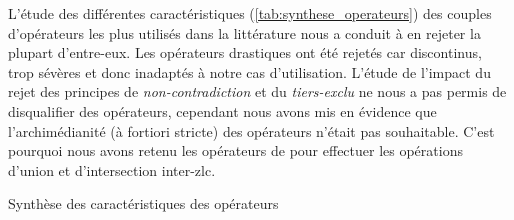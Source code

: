 L'étude des différentes caractéristiques
(\autoref{tab:synthese_operateurs}) des couples d'opérateurs les plus
utilisés dans la littérature nous a conduit à en rejeter la plupart
d'entre-eux. Les opérateurs drastiques ont été rejetés car
discontinus, trop sévères et donc inadaptés à notre cas
d'utilisation. L'étude de l'impact du rejet des principes de
\emph{non-contradiction} et du \emph{tiers-exclu} ne nous a pas permis
de disqualifier des opérateurs, cependant nous avons mis en évidence
que l'archimédianité (à fortiori stricte) des opérateurs n'était pas
souhaitable. C'est pourquoi nous avons retenu les opérateurs de
\textcite{Zadeh1965} pour effectuer les opérations d'union et
d'intersection inter-\ac{zlc}.

\begin{table}
  \centering
  
  \caption{Synthèse des caractéristiques des opérateurs}
  \label{tab:synthese_operateurs}
\end{table}


